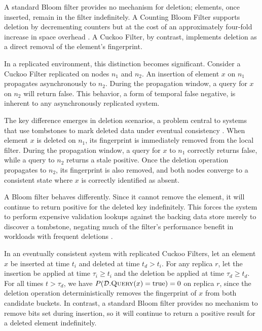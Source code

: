 A standard Bloom filter provides no mechanism for deletion; elements, once inserted, remain in the filter indefinitely. A Counting Bloom Filter supports deletion by decrementing counters but at the cost of an approximately four-fold increase in space overhead \cite{Fan2014CuckooFP}. A Cuckoo Filter, by contrast, implements deletion as a direct removal of the element's fingerprint.

In a replicated environment, this distinction becomes significant. Consider a Cuckoo Filter replicated on nodes $n_1$ and $n_2$. An insertion of element $x$ on $n_1$ propagates asynchronously to $n_2$. During the propagation window, a query for $x$ on $n_2$ will return false. This behavior, a form of temporal false negative, is inherent to any asynchronously replicated system.

The key difference emerges in deletion scenarios, a problem central to systems that use tombstones to mark deleted data under eventual consistency \cite{Mosharraf2021ImprovingLA}. When element $x$ is deleted on $n_1$, its fingerprint is immediately removed from the local filter. During the propagation window, a query for $x$ to $n_1$ correctly returns false, while a query to $n_2$ returns a stale positive. Once the deletion operation propagates to $n_2$, its fingerprint is also removed, and both nodes converge to a consistent state where $x$ is correctly identified as absent.

A Bloom filter behaves differently. Since it cannot remove the element, it will continue to return positive for the deleted key indefinitely. This forces the system to perform expensive validation lookups against the backing data store merely to discover a tombstone, negating much of the filter's performance benefit in workloads with frequent deletions \cite{Mosharraf2021ImprovingLA}.

\begin{proposition}
    In an eventually consistent system with replicated Cuckoo Filters, let an element $x$ be inserted at time $t_i$ and deleted at time $t_d > t_i$. For any replica $r$, let the insertion be applied at time $\tau_i \geq t_i$ and the deletion be applied at time $\tau_d \geq t_d$. For all times $t > \tau_d$, we have $P(\mathcal{D}.\textsc{Query}(x) = \text{true}) = 0$ on replica $r$, since the deletion operation deterministically removes the fingerprint of $x$ from both candidate buckets. In contrast, a standard Bloom filter provides no mechanism to remove bits set during insertion, so it will continue to return a positive result for a deleted element indefinitely.
\end{proposition}

